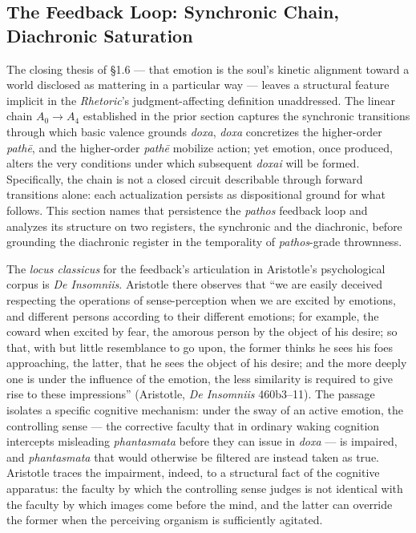 \subsection{The Feedback Loop: Synchronic Chain, Diachronic Saturation}

The closing thesis of \S1.6 --- that emotion is the soul's kinetic alignment toward a world disclosed as mattering in a particular way --- leaves a structural feature implicit in the \textit{Rhetoric}'s judgment-affecting definition unaddressed. The linear chain $A_0 \rightarrow A_4$ established in the prior section captures the synchronic transitions through which basic valence grounds \textit{doxa}, \textit{doxa} concretizes the higher-order \textit{path\=e}, and the higher-order \textit{path\=e} mobilize action; yet emotion, once produced, alters the very conditions under which subsequent \textit{doxai} will be formed. Specifically, the chain is not a closed circuit describable through forward transitions alone: each actualization persists as dispositional ground for what follows. This section names that persistence the \textit{pathos} feedback loop and analyzes its structure on two registers, the synchronic and the diachronic, before grounding the diachronic register in the temporality of \textit{pathos}-grade thrownness.

The \textit{locus classicus} for the feedback's articulation in Aristotle's psychological corpus is \textit{De Insomniis}. Aristotle there observes that ``we are easily deceived respecting the operations of sense-perception when we are excited by emotions, and different persons according to their different emotions; for example, the coward when excited by fear, the amorous person by the object of his desire; so that, with but little resemblance to go upon, the former thinks he sees his foes approaching, the latter, that he sees the object of his desire; and the more deeply one is under the influence of the emotion, the less similarity is required to give rise to these impressions'' (Aristotle, \textit{De Insomniis} 460b3--11). The passage isolates a specific cognitive mechanism: under the sway of an active emotion, the controlling sense --- the corrective faculty that in ordinary waking cognition intercepts misleading \textit{phantasmata} before they can issue in \textit{doxa} --- is impaired, and \textit{phantasmata} that would otherwise be filtered are instead taken as true. Aristotle traces the impairment, indeed, to a structural fact of the cognitive apparatus: the faculty by which the controlling sense judges is not identical with the faculty by which images come before the mind, and the latter can override the former when the perceiving organism is sufficiently agitated.

